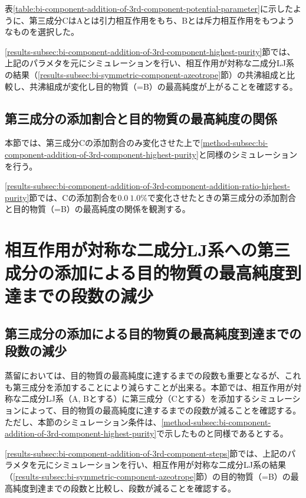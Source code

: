 \documentclass[titlepage]{jsreport}
\begin{document}
表\ref{table:bi-component-addition-of-3rd-component-potential-parameter}に示したように、第三成分CはAとは引力相互作用をもち、Bとは斥力相互作用をもつようなものを選択した。

\ref{results-subsec:bi-component-addition-of-3rd-component-highest-purity}節では、上記のパラメタを元にシミュレーションを行い、相互作用が対称な二成分LJ系の結果（\ref{results-subsec:bi-symmetric-component-azeotrope}節）の共沸組成と比較し、共沸組成が変化し目的物質（=B）の最高純度が上がることを確認する。


\subsection{第三成分の添加割合と目的物質の最高純度の関係} \label{method-subsec:bi-component-addition-of-3rd-component-addition-ratio-highest-purity}
本節では、第三成分Cの添加割合のみ変化させた上で\ref{method-subsec:bi-component-addition-of-3rd-component-highest-purity}と同様のシミュレーションを行う。

\ref{results-subsec:bi-component-addition-of-3rd-component-addition-ratio-highest-purity}節では、Cの添加割合を$0.0~1.0\%$で変化させたときの第三成分の添加割合と目的物質（=B）の最高純度の関係を観測する。

\section{相互作用が対称な二成分LJ系への第三成分の添加による目的物質の最高純度到達までの段数の減少} \label{method-sec:bi-component-addition-of-3rd-component-steps}
\subsection{第三成分の添加による目的物質の最高純度到達までの段数の減少} \label{method-subsec:bi-component-addition-of-3rd-component-steps}
蒸留においては、目的物質の最高純度に達するまでの段数も重要となるが、これも第三成分を添加することにより減らすことが出来る\cite{azeotrope-add_third_component}。本節では、相互作用が対称な二成分LJ系（A, Bとする）に第三成分（Cとする）を添加するシミュレーションによって、目的物質の最高純度に達するまでの段数が減ることを確認する。
ただし、本節のシミュレーション条件は、\ref{method-subsec:bi-component-addition-of-3rd-component-highest-purity}で示したものと同様であるとする。

\ref{results-subsec:bi-component-addition-of-3rd-component-steps}節では、上記のパラメタを元にシミュレーションを行い、相互作用が対称な二成分LJ系の結果（\ref{results-subsec:bi-symmetric-component-azeotrope}節）の目的物質（=B）の最高純度到達までの段数と比較し、段数が減ることを確認する。
\end{document}
